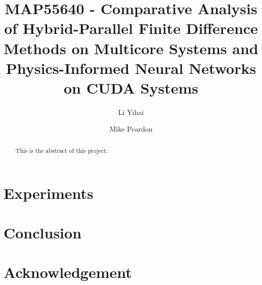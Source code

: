 \documentclass[manuscript, screen, review, language=english, natbib=false]{acmart}
\begin{document}
\title[Final Project]{MAP55640 - 
Comparative Analysis of Hybrid-Parallel Finite Difference Methods on Multicore Systems 
and 
Physics-Informed Neural Networks on CUDA Systems}


\author{Li Yihai}

\author{Mike Peardon}




\begin{abstract}
  This is the abstract of this project.

  \lipsum[2-4]
\end{abstract}
    

\maketitle







\section{Experiments}
\section{Conclusion}
\section{Acknowledgement}


% 
% 

\printbibliography

\appendix
\end{document}
